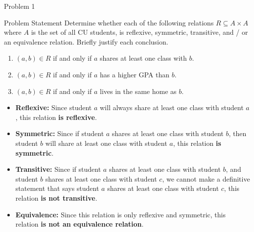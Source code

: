 \begin{problem}{Problem 1}
    \begin{statement}{Problem Statement}
        Determine whether each of the following relations $R \subseteq A \times A$ where $A$ is the set of all CU students, is reflexive, symmetric, transitive, and / or an equivalence relation. Briefly 
        justify each conclusion.

        \begin{enumerate}[label = (\alph*)]
            \item $(a,b) \in R$ if and only if $a$ shares at least one class with $b$.
            \item $(a,b) \in R$ if and only if $a$ has a higher GPA than $b$.
            \item $(a,b) \in R$ if and only if $a$ lives in the same home as $b$.
        \end{enumerate}
    \end{statement}

    \begin{Highlight}
        \begin{itemize}
            \item \textbf{Reflexive:} Since student $a$ will always share at least one class with student $a$, this relation \textbf{is reflexive}.
            \item \textbf{Symmetric:} Since if student $a$ shares at least one class with student $b$, then student $b$ will share at least one class with student $a$, this relation \textbf{is symmetric}.
            \item \textbf{Transitive:} Since if student $a$ shares at least one class with student $b$, and student $b$ shares at least one class with student $c$, we cannot make a definitive statement
            that says student $a$ shares at least one class with student $c$, this relation \textbf{is not transitive}.
            \item \textbf{Equivalence:} Since this relation is only reflexive and symmetric, this relation \textbf{is not an equivalence relation}.
        \end{itemize}
    \end{Highlight}


\end{problem}
